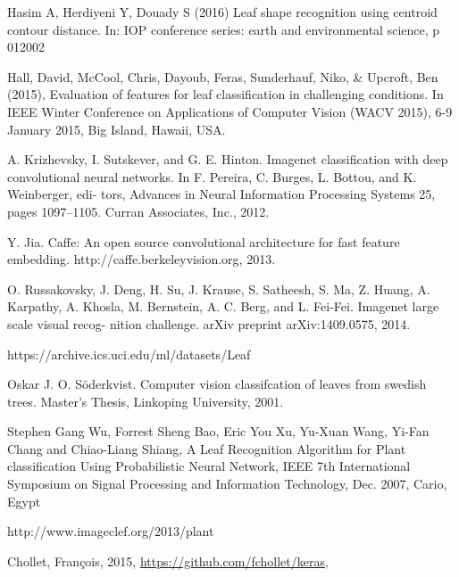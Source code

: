 \documentclass[journal]{IEEEtran}
\begin{document}
\begin{thebibliography}{1}
    Hasim A, Herdiyeni Y, Douady S (2016) Leaf shape recognition using centroid contour distance. In: IOP conference series: earth and environmental science, p 012002

    Hall, David, McCool, Chris, Dayoub, Feras, Sunderhauf, Niko, \& Upcroft, Ben (2015), Evaluation of features for leaf classification in challenging conditions. In IEEE Winter Conference on Applications of Computer Vision (WACV 2015), 6-9 January 2015, Big Island, Hawaii, USA.


    A. Krizhevsky, I. Sutskever, and G. E. Hinton. Imagenet classification with deep convolutional neural networks. In F. Pereira, C. Burges, L. Bottou, and K. Weinberger, edi- tors, Advances in Neural Information Processing Systems 25, pages 1097–1105. Curran Associates, Inc., 2012.

    Y. Jia. Caffe: An open source convolutional architecture for fast feature embedding. http://caffe.berkeleyvision.org, 2013.

    O. Russakovsky, J. Deng, H. Su, J. Krause, S. Satheesh, S. Ma, Z. Huang, A. Karpathy, A. Khosla, M. Bernstein, A. C. Berg, and L. Fei-Fei. Imagenet large scale visual recog- nition challenge. arXiv preprint arXiv:1409.0575, 2014.

    https://archive.ics.uci.edu/ml/datasets/Leaf

    Oskar J. O. Söderkvist. Computer vision classifcation of leaves from swedish trees. Master's Thesis, Linkoping University, 2001.

    Stephen Gang Wu, Forrest Sheng Bao, Eric You Xu, Yu-Xuan Wang, Yi-Fan Chang and Chiao-Liang Shiang, A Leaf Recognition Algorithm for Plant classification Using Probabilistic Neural Network, IEEE 7th International Symposium on Signal Processing and Information Technology, Dec. 2007, Cario, Egypt

    http://www.imageclef.org/2013/plant

    Chollet, Fran\c{c}ois, 2015, \url{https://github.com/fchollet/keras},
\end{thebibliography}

%
\end{document}
